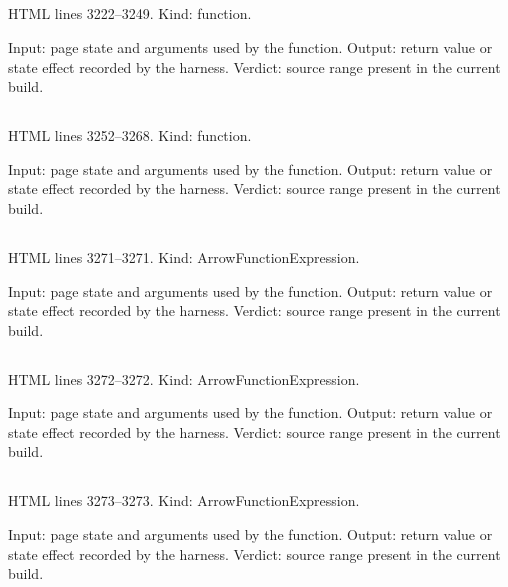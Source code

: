\subsection*{\texttt{}}
\label{vf_100_readZip}
HTML lines 3222--3249. Kind: function.

Input: page state and arguments used by the function.
Output: return value or state effect recorded by the harness.
Verdict: source range present in the current build.

\subsection*{\texttt{}}
\label{vf_101_makeZip}
HTML lines 3252--3268. Kind: function.

Input: page state and arguments used by the function.
Output: return value or state effect recorded by the harness.
Verdict: source range present in the current build.

\subsection*{\texttt{}}
\label{vf_102_xml}
HTML lines 3271--3271. Kind: ArrowFunctionExpression.

Input: page state and arguments used by the function.
Output: return value or state effect recorded by the harness.
Verdict: source range present in the current build.

\subsection*{\texttt{}}
\label{vf_103_kid}
HTML lines 3272--3272. Kind: ArrowFunctionExpression.

Input: page state and arguments used by the function.
Output: return value or state effect recorded by the harness.
Verdict: source range present in the current build.

\subsection*{\texttt{}}
\label{vf_104_kids}
HTML lines 3273--3273. Kind: ArrowFunctionExpression.

Input: page state and arguments used by the function.
Output: return value or state effect recorded by the harness.
Verdict: source range present in the current build.

